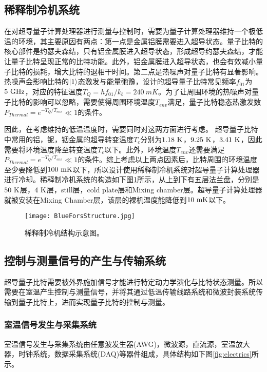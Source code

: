 \subsection{稀释制冷机系统}
在对超导量子计算处理器进行测量与控制时，需要为量子计算处理器维持一个极低温的环境，其主要原因有两点：第一点是金属铝膜需要进入超导状态。量子比特的核心部件是约瑟夫森结，只有铝金属膜进入超导状态，形成超导约瑟夫森结，才能让量子比特呈现正常的比特功能。此外，铝金属膜进入超导状态，也会有效减小量子比特的损耗，增大比特的退相干时间。第二点是热噪声对量子比特有显著影响。热噪声会影响比特的$\left|1\right>$态激发与能量弛豫，设计的超导量子比特常见频率$ f_{01}$为$\rm 5 \ GHz$，对应的特征温度$ T_{Q} = hf_{01}/k_{b}=240\ {mK}$。为了让周围环境的热噪声对量子比特的影响可以忽略，需要使得周围环境温度$T_{env}$满足，量子比特稳态热激发数$P_{Thermal}=e^{-T_{Q}/T_{env}}\ll 1$的条件。

因此，在考虑维持的低温温度时，需要同时对这两方面进行考虑。
超导量子比特中常用的铝，铌，铟金属的超导转变温度$T_{c}$分别为$\rm 1.18 \ K$，$\rm 9.25 \ K$，$\rm 3.41 \ K$，因此需要将环境温度降至转变温度$ T_{c}$以下。此外，环境温度$ T_{env}$还需要满足$ P_{Thermal}=e^{-T_{Q}/T_{env}}\ll 1 $的条件。综上考虑以上两点因素后，比特周围的环境温度至少要降低到$\rm 100 \ mK$以下，所以设计使用稀释制冷机系统对超导量子计算处理器进行冷却。稀释制冷机系统的构造如下图\ref{fig:BlueForsStructure}所示，从上到下有五层法兰盘，分别是$\rm 50 \ K$层，$\rm 4 \ K$层，still层，cold plate层和Mixing chamber层。超导量子计算处理器就被安装在Mixing Chamber层，该层的裸机温度能降低到$\rm 10 \ mK$以下。

\begin{figure}[h]
	\centering
	\texttt{[image: BlueForsStructure.jpg]}
	\caption{稀释制冷机结构示意图。}
	\label{fig:BlueForsStructure}
\end{figure}
\subsection{控制与测量信号的产生与传输系统}
超导量子比特需要被外界施加信号才能进行特定动力学演化与比特状态测量。所以需要在室温产生控制与测量信号，并将其通过低温传输线路系统和微波封装系统传输到量子比特上，进而实现量子比特的控制与测量。
\subsubsection{室温信号发生与采集系统}
室温信号发生与采集系统由任意波发生器(AWG)，微波源，直流源，室温放大器，时钟系统，数据采集系统(DAQ)等器件组成，具体结构如下图\ref{fig:electrics}所示。

